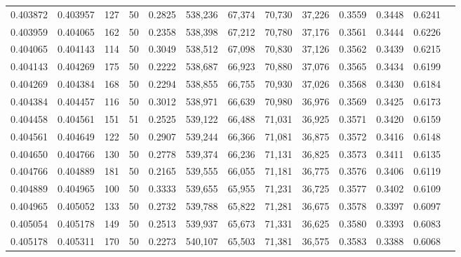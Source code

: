 \begin{tabular}{rrrrrrrrrrrrr}
0.403872 & 0.403957 &   127 &  50 &                                     0.2825 & 538,236 &  67,374 &  70,730 &  37,226 & 0.3559 & 0.3448 & 0.6241 \\
0.403959 & 0.404065 &   162 &  50 &                                     0.2358 & 538,398 &  67,212 &  70,780 &  37,176 & 0.3561 & 0.3444 & 0.6226 \\
0.404065 & 0.404143 &   114 &  50 &                                     0.3049 & 538,512 &  67,098 &  70,830 &  37,126 & 0.3562 & 0.3439 & 0.6215 \\
0.404143 & 0.404269 &   175 &  50 &                                     0.2222 & 538,687 &  66,923 &  70,880 &  37,076 & 0.3565 & 0.3434 & 0.6199 \\
0.404269 & 0.404384 &   168 &  50 &                                     0.2294 & 538,855 &  66,755 &  70,930 &  37,026 & 0.3568 & 0.3430 & 0.6184 \\
0.404384 & 0.404457 &   116 &  50 &                                     0.3012 & 538,971 &  66,639 &  70,980 &  36,976 & 0.3569 & 0.3425 & 0.6173 \\
0.404458 & 0.404561 &   151 &  51 &                                     0.2525 & 539,122 &  66,488 &  71,031 &  36,925 & 0.3571 & 0.3420 & 0.6159 \\
0.404561 & 0.404649 &   122 &  50 &                                     0.2907 & 539,244 &  66,366 &  71,081 &  36,875 & 0.3572 & 0.3416 & 0.6148 \\
0.404650 & 0.404766 &   130 &  50 &                                     0.2778 & 539,374 &  66,236 &  71,131 &  36,825 & 0.3573 & 0.3411 & 0.6135 \\
0.404766 & 0.404889 &   181 &  50 &                                     0.2165 & 539,555 &  66,055 &  71,181 &  36,775 & 0.3576 & 0.3406 & 0.6119 \\
0.404889 & 0.404965 &   100 &  50 &                                     0.3333 & 539,655 &  65,955 &  71,231 &  36,725 & 0.3577 & 0.3402 & 0.6109 \\
0.404965 & 0.405052 &   133 &  50 &                                     0.2732 & 539,788 &  65,822 &  71,281 &  36,675 & 0.3578 & 0.3397 & 0.6097 \\
0.405054 & 0.405178 &   149 &  50 &                                     0.2513 & 539,937 &  65,673 &  71,331 &  36,625 & 0.3580 & 0.3393 & 0.6083 \\
0.405178 & 0.405311 &   170 &  50 &                                     0.2273 & 540,107 &  65,503 &  71,381 &  36,575 & 0.3583 & 0.3388 & 0.6068 \\

\end{tabular}
